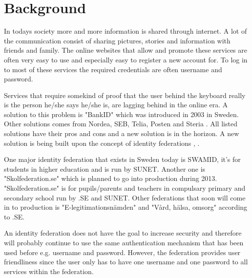 \section{Background}
In todays society more and more information is shared through internet.
A lot of the communication consist of sharing pictures, stories and information with friends and family.
The online websites that allow and promote these services are often very easy to use and especially easy to register a new account for.
To log in to most of these services the required credentials are often username and password. 

Services that require somekind of proof that the user behind the keyboard really is the person he/she says he/she is, are lagging behind in the online era.
A solution to this problem is "BankID" which was introduced in 2003 \cite{website:bankid-about} in Sweden.
Other solutions comes from Nordea, SEB, Telia, Posten and Steria \cite[p.~256]{pdf:SOU}.
All listed solutions have their pros and cons and a new solution is in the horizon.
A new solution is being built upon the concept of identity federations \cite[p.~23]{pdf:SOU}, \cite{website:elegnamnd}.

One major identity federation that exists in Sweden today is SWAMID, it's for students in higher education and is run by SUNET.
Another one is "Skolfederation.se" which is planned to go into production during 2013.
"Skolfederation.se" is for pupils/parents and teachers in compulsary primary and secondary school run by .SE and SUNET. 
Other federations that soon will come in to production is "E-legitimationsn{\"a}mden" \cite{website:elegnamnd} and "V\r{a}rd, h{\"a}lsa, omsorg" according to .SE.  

An identity federation does not have the goal to increase security and therefore will probably continue to use the same authentication mechanism that has been used before e.g. username and password. 
However, the federation provides user friendliness since the user only has to have one username and one password to all services within the federation. 



